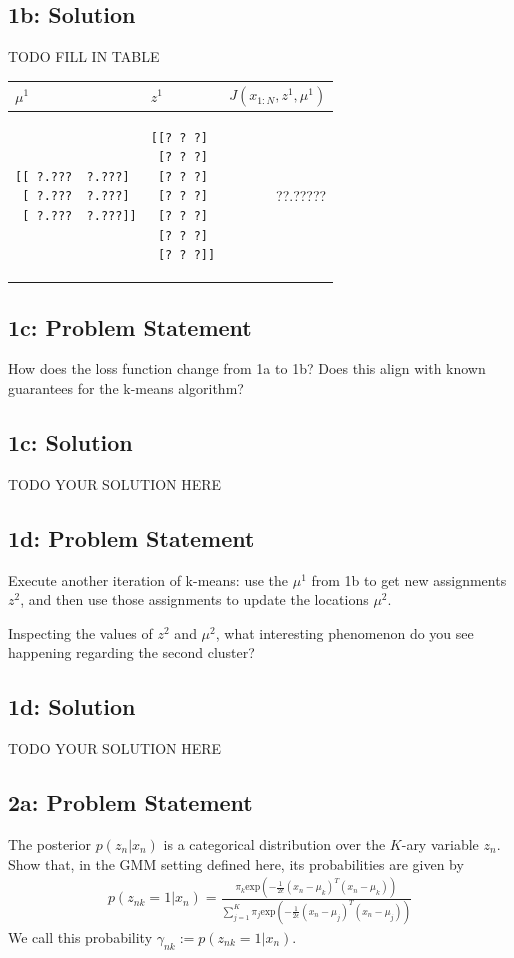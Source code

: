 \documentclass[10pt]{article}
\newcommand{\officialdirections}[1]{{\color{purple} #1}}
\begin{document}
\subsection{1b: Solution}
TODO FILL IN TABLE

\begin{tabular}{p{5cm} | p{5cm} | r}
$\mu^1$ & $z^1$ & $J(x_{1:N}, z^1, \mu^1)$
\\
\midrule
\begin{verbatim}
[[ ?.???  ?.???]
 [ ?.???  ?.???]
 [ ?.???  ?.???]]
\end{verbatim}
&	
\begin{verbatim}
[[? ? ?]
 [? ? ?]
 [? ? ?]
 [? ? ?]
 [? ? ?]
 [? ? ?]
 [? ? ?]]
\end{verbatim}
&
 ??.?????
\end{tabular}


\newpage
\officialdirections{
\subsection*{1c: Problem Statement}
How does the loss function change from 1a to 1b? Does this align with known guarantees for the k-means algorithm?
}
\subsection{1c: Solution}
TODO YOUR SOLUTION HERE


\newpage
\officialdirections{
\subsection*{1d: Problem Statement}
Execute another iteration of k-means: use the $\mu^1$ from 1b to get new assignments $z^2$, and then use those assignments to update the locations $\mu^2$. 

Inspecting the values of $z^2$ and $\mu^2$, what interesting phenomenon do you see happening regarding the second cluster?
}
\subsection{1d: Solution}
TODO YOUR SOLUTION HERE


\newpage
\officialdirections{\subsection*{2a: Problem Statement}
The posterior $p(z_n|x_n)$ is a categorical distribution over the $K$-ary variable $z_n$. Show that, in the GMM setting defined here, its probabilities are given by
\begin{align*}
p(z_{nk}=1|x_n) = \frac
	{ \pi_k \text{exp}( - \frac{1}{2\epsilon} (x_n - \mu_k)^T(x_n - \mu_k) )}
	{ \sum_{j=1}^K \pi_j \text{exp}( - \frac{1}{2\epsilon} (x_n - \mu_j)^T (x_n - \mu_j) )}
\end{align*}
We call this probability $\gamma_{nk} := p(z_{nk}=1|x_n)$.
}
\end{document}
